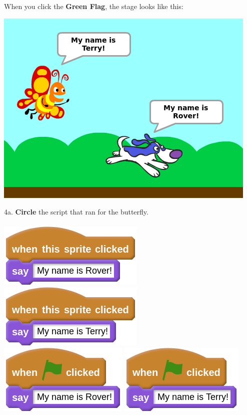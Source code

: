 \documentclass[letterpaper,12pt]{article}
\begin{document}
\newpage
\noindent When you click the \textbf{Green Flag}, the stage looks like this:
\begin{center}
\includegraphics[scale=.5]{q4_stage.png}
\end{center}

\noindent 4a. \textbf{Circle} the script that ran for the butterfly. \\ \\
\includegraphics[scale=.4,valign=t]{q4_script0.png} \hspace{1cm}
\includegraphics[scale=.4,valign=t]{q4_script1.png} \hspace{1cm}
\includegraphics[scale=.4,valign=t]{q4_script2.png} \hspace{1cm}
\includegraphics[scale=.4,valign=t]{q4_script3.png} \hspace{1cm}
\vspace{1cm}
\end{document}
